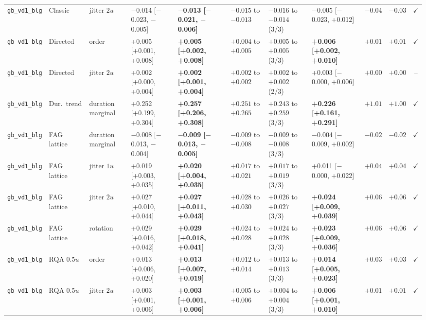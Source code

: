 \begin{longtable}{lllllllllrc}
\texttt{gb\_vd1\_blg} & Classic & jitter $2u$ & $-$0.014 [$-$0.023, $-$0.005] & \textbf{$-$0.013 [$-$0.021, $-$0.006]} & $-0.015$ to $-0.013$ & $-0.016$ to $-0.014$ (3/3) & $-$0.005 [$-$0.023, +0.012] & $-0.04$ & $-0.03$ & $\checkmark$ \\
\texttt{gb\_vd1\_blg} & Directed & order & +0.005 [+0.001, +0.008] & \textbf{+0.005 [+0.002, +0.008]} & $+0.004$ to $+0.005$ & $+0.005$ to $+0.005$ (3/3) & \textbf{+0.006 [+0.002, +0.010]} & $+0.01$ & $+0.01$ & $\checkmark$ \\
\texttt{gb\_vd1\_blg} & Directed & jitter $2u$ & +0.002 [+0.000, +0.004] & \textbf{+0.002 [+0.001, +0.004]} & $+0.002$ to $+0.002$ & $+0.002$ to $+0.002$ (2/3) & +0.003 [$-$0.000, +0.006] & $+0.00$ & $+0.00$ & -- \\
\texttt{gb\_vd1\_blg} & Dur.\ trend & duration marginal & +0.252 [+0.199, +0.304] & \textbf{+0.257 [+0.206, +0.308]} & $+0.251$ to $+0.265$ & $+0.243$ to $+0.259$ (3/3) & \textbf{+0.226 [+0.161, +0.291]} & $+1.01$ & $+1.00$ & $\checkmark$ \\
\texttt{gb\_vd1\_blg} & FAG lattice & duration marginal & $-$0.008 [$-$0.013, $-$0.004] & \textbf{$-$0.009 [$-$0.013, $-$0.005]} & $-0.009$ to $-0.008$ & $-0.009$ to $-0.008$ (3/3) & $-$0.004 [$-$0.009, +0.002] & $-0.02$ & $-0.02$ & $\checkmark$ \\
\texttt{gb\_vd1\_blg} & FAG lattice & jitter $1u$ & +0.019 [+0.003, +0.035] & \textbf{+0.020 [+0.004, +0.035]} & $+0.017$ to $+0.021$ & $+0.017$ to $+0.019$ (3/3) & +0.011 [$-$0.000, +0.022] & $+0.04$ & $+0.04$ & $\checkmark$ \\
\texttt{gb\_vd1\_blg} & FAG lattice & jitter $2u$ & +0.027 [+0.010, +0.044] & \textbf{+0.027 [+0.011, +0.043]} & $+0.028$ to $+0.030$ & $+0.026$ to $+0.027$ (3/3) & \textbf{+0.024 [+0.009, +0.039]} & $+0.06$ & $+0.06$ & $\checkmark$ \\
\texttt{gb\_vd1\_blg} & FAG lattice & rotation & +0.029 [+0.016, +0.042] & \textbf{+0.029 [+0.018, +0.041]} & $+0.024$ to $+0.028$ & $+0.024$ to $+0.028$ (3/3) & \textbf{+0.023 [+0.009, +0.036]} & $+0.06$ & $+0.06$ & $\checkmark$ \\
\texttt{gb\_vd1\_blg} & RQA $0.5u$ & order & +0.013 [+0.006, +0.020] & \textbf{+0.013 [+0.007, +0.019]} & $+0.012$ to $+0.014$ & $+0.013$ to $+0.013$ (3/3) & \textbf{+0.014 [+0.005, +0.023]} & $+0.03$ & $+0.03$ & $\checkmark$ \\
\texttt{gb\_vd1\_blg} & RQA $0.5u$ & jitter $2u$ & +0.003 [+0.001, +0.006] & \textbf{+0.003 [+0.001, +0.006]} & $+0.005$ to $+0.006$ & $+0.004$ to $+0.004$ (3/3) & \textbf{+0.006 [+0.001, +0.010]} & $+0.01$ & $+0.01$ & $\checkmark$ \\

\end{longtable}
